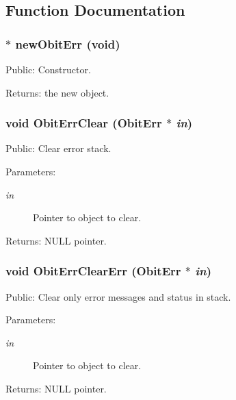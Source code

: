 \subsection{Function Documentation}
\subsubsection{$\ast$ new\-Obit\-Err (void)}\label{ObitErr_8h_a16}


Public: Constructor. 

\begin{Desc}
\item[Returns:]the new object. \end{Desc}
\subsubsection{\setlength{\rightskip}{0pt plus 5cm}void Obit\-Err\-Clear ({\bf Obit\-Err} $\ast$ {\em in})}\label{ObitErr_8h_a19}


Public: Clear error stack. 

\begin{Desc}
\item[Parameters:]
\begin{description}
\item[{\em in}]Pointer to object to clear. \end{description}
\end{Desc}
\begin{Desc}
\item[Returns:]NULL pointer. \end{Desc}
\subsubsection{\setlength{\rightskip}{0pt plus 5cm}void Obit\-Err\-Clear\-Err ({\bf Obit\-Err} $\ast$ {\em in})}\label{ObitErr_8h_a20}


Public: Clear only error messages and status in stack. 

\begin{Desc}
\item[Parameters:]
\begin{description}
\item[{\em in}]Pointer to object to clear. \end{description}
\end{Desc}
\begin{Desc}
\item[Returns:]NULL pointer. \end{Desc}
